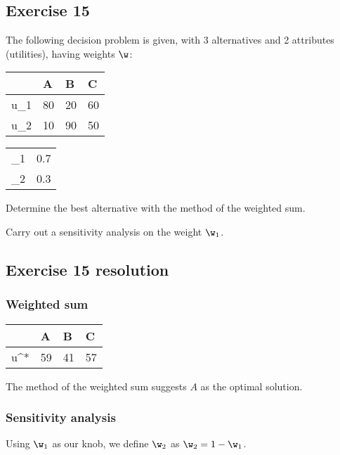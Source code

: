 \documentclass[\main/main.tex]{subfiles}
\begin{document}
\subsection{Exercise 15}
The following decision problem is given, with 3 alternatives and 2 attributes (utilities), having weights $\w$:

\begin{table}
  \begin{tabular}{L|LLL}
     & A  & B  & C  \\
    \hline
    u_1               & 80 & 20 & 60 \\
    u_2               & 10 & 90 & 50
  \end{tabular}
  \begin{tabular}{L|L}
         &  \\
    \hline
    \w_1 & 0.7            \\
    \w_2 & 0.3
  \end{tabular}
\end{table}

Determine the best alternative with the method of the weighted sum.

Carry out a sensitivity analysis on the weight $\w_1$.

\subsection{Exercise 15 resolution}

\subsubsection*{Weighted sum}

\begin{table}
  \begin{tabular}{L|LLL}
     & A  & B  & C  \\
    \hline
    u^*               & 59 & 41 & 57 \\
  \end{tabular}
\end{table}

The method of the weighted sum suggests $A$ as the optimal solution.

\subsubsection*{Sensitivity analysis}
Using $\w_1$ as our knob, we define $\w_2$ as $\w_2 = 1-\w_1$.
\end{document}

